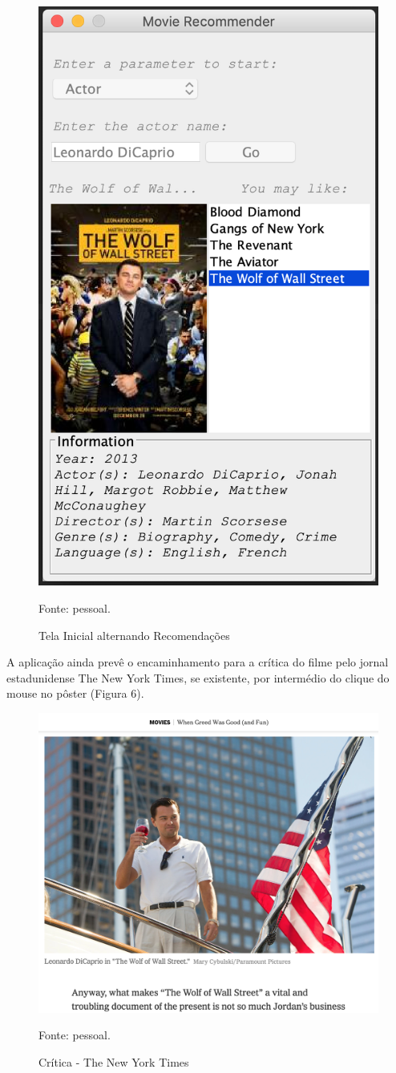    \begin{figure}[H]
	\centering
	\includegraphics[width=0.5\linewidth]{images/telaInicialRecomendacao2}
	\caption{Tela Inicial alternando Recomendações}
	Fonte: pessoal.
	\label{fig:Tela Inicial alternando Recomendações}
\end{figure}
 
 A aplicação ainda prevê o encaminhamento para a crítica do filme pelo jornal estadunidense The New York Times, se existente, por intermédio do clique do mouse no pôster (Figura 6).
 
   \begin{figure}[H]
	\centering
	\includegraphics[width=0.5\linewidth]{images/NYTIMES}
	\caption{Crítica - The New York Times}
	Fonte: pessoal.
	\label{fig:Crítica - The New York Times}
\end{figure}